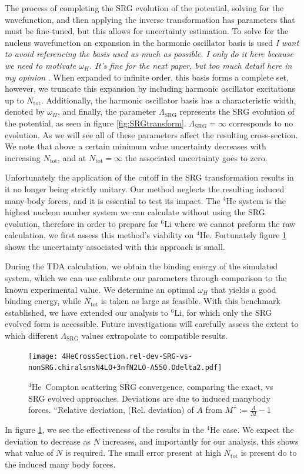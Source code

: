 \documentclass[a4paper,11pt]{article}
\newcommand{\Ntot}{N_{\mathrm{tot}}}
\newcommand{\LamSRG}{\Lambda_{\mathrm{SRG}}}
\newcommand{\LiS}{{}^{6} \mathrm{Li} }
\newcommand{\HeF}{{}^{4} \mathrm{He}}
\newcommand{\ques}[1]{\color{red}\textit{ #1 }\color{black}}
\begin{document}
The process of completing the SRG evolution of the potential, solving for the wavefunction,
and then applying the inverse transformation has parameters that must be fine-tuned, but this
allows for uncertainty estimation.
To solve for the nucleus wavefunction an expansion in the harmonic oscillator basis is used
\ques{I want to avoid referencing the basis used as much as possible. I only do it here because we need to motivate $\omega_H$. It's fine for the next paper, but too much detail here in my opinion}.
When expanded to infinite order, this basis forms a complete set,
however, we truncate this expansion by including harmonic oscillator excitations up to $\Ntot$.
Additionally, the harmonic oscillator basis has a characteristic
width, denoted by $\omega_H$, and finally, the parameter $\LamSRG$
represents the SRG evolution of the potential, as seen in figure
\ref{fig:SRGtransform}. $\LamSRG=\infty$ corresponds to no evolution.
As we will see all of these parameters affect the resulting cross-section. 
We note that above a certain minimum value uncertainty decreases with increasing
$\Ntot$, and at $\Ntot=\infty$ the associated uncertainty goes to zero.

Unfortunately the application of the cutoff in the SRG transformation results in it no longer being strictly unitary. 
Our method neglects the resulting induced many-body  forces, and it is essential to test its impact.
The $\HeF$ system is the highest nucleon number system we can calculate without using the SRG evolution, therefore in order to prepare for $\LiS$ where we cannot preform the raw calculation, we first assess this method's viability on $\HeF$. 
Fortunately figure \ref{fig:SRGConverge4He} shows the uncertainty associated with this approach is small.

During the TDA calculation, we obtain the binding energy of the simulated system, which we can use calibrate our parameters through comparison to the known experimental value.
We determine an optimal $\omega_H$ that yields a good binding energy, while $\Ntot$ is taken as large as feasible.
With this benchmark established, we have extended our analysis to $\LiS$, for which only the SRG evolved form is accessible.
Future investigations \cite{upcoming} will carefully assess the extent to which different $\LamSRG$ values extrapolate to compatible results.


\begin{figure}[H]
  \begin{center}
    \texttt{[image: 
    4HeCrossSection.rel-dev-SRG-vs-nonSRG.chiralsmsN4LO+3nfN2LO-Λ550.Odelta2.pdf]}
    \caption{$\HeF$\, Compton scattering SRG convergence, comparing the exact, vs SRG evolved approaches. Deviations are due to induced manybody forces. ``Relative deviation, (Rel. deviation) of $A$ from $M$''$:= \frac{A}{M}-1$}
    \label{fig:SRGConverge4He}
  \end{center}
\end{figure}
In figure \ref{fig:SRGConverge4He}, we see the effectiveness of the
results in the $\HeF$ case.
We expect the deviation to decrease as $N$ increases, and importantly
for our analysis, this shows what value of $N$ is required.
The small error present at high $\Ntot$ is present do to the induced many body forces.
\end{document}
